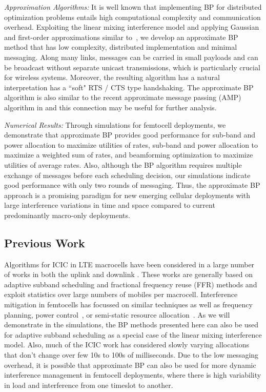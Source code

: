 \documentclass[letterpaper,twocolumn,twoside]{IEEEtran}
\begin{document}
\noindent \emph{Approximation Algorithms:} It is well known that
implementing BP for distributed optimization problems entails high
computational complexity and communication overhead.
Exploiting the linear mixing interference model and applying
Gaussian  and first-order approximations
similar to~\cite{BouCaire:02,MontanariT:06,GuoW:06,BayatiM:10arxiv,Rangan:10arXiv},
we develop an approximate BP method that has low complexity,
distributed implementation and minimal messaging.
Along many links, messages can
be carried in small payloads and can be broadcast without separate
unicast transmissions, which is particularly crucial for wireless
systems.  Moreover, the resulting algorithm has a natural interpretation
has a ``soft" RTS / CTS type handshaking.  The approximate BP algorithm
is also similar to the recent approximate message passing (AMP) algorithm
in \cite{DonohoMM:09arxiv,BayatiM:10arxiv} and this connection may be useful
for further analysis.

\noindent \emph{Numerical Results:} Through simulations for
femtocell deployments, we demonstrate that approximate BP provides
good performance for sub-band and power allocation to maximize
utilities of rates, sub-band and power allocation to maximize a
weighted sum of rates, and beamforming optimization to maximize
utilities of average rates. Also, although the BP algorithm requires
multiple exchange of messages before each scheduling decision, our
simulations indicate good performance with only two rounds of
messaging. Thus, the approximate BP approach is a promising paradigm
for new emerging cellular deployments with large interference
variations in time and space compared to current predominantly
macro-only deployments.


\subsection{Previous Work}

Algorithms for ICIC in LTE macrocells have been considered in a
large number of works in both the uplink and downlink
\cite{RahmanYW:09,FodorKRRSM:09,XiangLH:07}. These works are
generally based on adaptive subband scheduling and
fractional frequency reuse (FFR) methods
\cite{HanPLAJ:08,StolyarVis:2009} and exploit statistics over large
numbers of mobiles per macrocell.
Interference mitigation in femtocells has focussed on similar techniques as well
as frequency planning, power control~\cite{chandra_2008}, or
semi-static resource allocation~\cite{kang_2008,humblet_2009,sundaresan_2008}.
As we will demonstrate
in the simulations, the BP methods presented here can also be used
for adaptive subband scheduling as a special case of the linear mixing interference
model.
Also, much of the ICIC work has considered slowly varying allocations
that don't change over few 10s to 100s of milliseconds.
Due to the low messaging overhead, it is possible that approximate BP
can also be used for more dynamic interference
management in femtocell deployments, where there is high variability
in load and interference from one timeslot to another.
\end{document}
